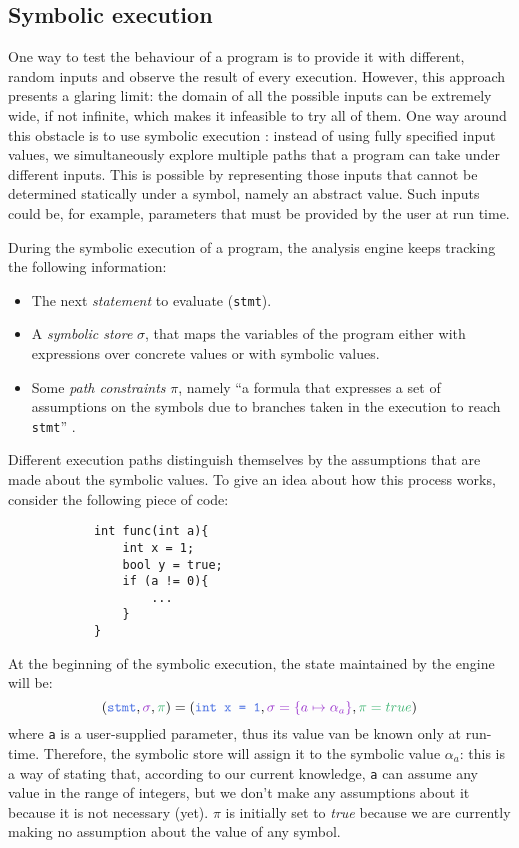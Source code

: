 \documentclass[target=mst,aauheader=aics]{thud}
\theoremstyle{definition}
\begin{document}
	\subsection{Symbolic execution}\label{sec:symbolic-exec}
	One way to test the behaviour of a program is to provide it with different, random inputs and observe the result of every execution. However, this approach presents a glaring limit: the domain of all the possible inputs can be extremely wide, if not infinite, which makes it infeasible to try all of them. One way around this obstacle is to use symbolic execution \cite{Baldoni2018} \cite{King76}: instead of using fully specified input values, we simultaneously explore multiple paths that a program can take under different inputs. This is possible by representing those inputs that cannot be determined statically under a symbol, namely an abstract value. Such inputs could be, for example, parameters that must be provided by the user at run time.
	
	During the symbolic execution of a program, the analysis engine keeps tracking the following information:
	\begin{itemize}
		\item The next \textit{statement} to evaluate (\texttt{stmt}).
		\item A \textit{symbolic store} $\sigma$, that maps the variables of the program either with expressions over concrete values or with symbolic values.
		\item Some \textit{path constraints} $\pi$, namely ``a formula that expresses a set of assumptions on the symbols due to branches taken in the execution to reach \texttt{stmt}'' \cite{Baldoni2018}.
	\end{itemize}
	Different execution paths distinguish themselves by the assumptions that are made about the symbolic values. To give an idea about how this process works, consider the following piece of code:
	
	\vspace{3mm}
	\begin{minipage}{.4\textwidth}
		\begin{lstlisting}
			int func(int a){
				int x = 1;
				bool y = true;
				if (a != 0){
					...
				}
			}
		\end{lstlisting} 
	\end{minipage}
	
	At the beginning of the symbolic execution, the state maintained by the engine will be:
	\[
	(\textcolor{blue}{\texttt{stmt}}, \textcolor{violet}{\sigma}, \textcolor{green}{\pi}) = (\textcolor{blue}{\texttt{int x = 1}}, \textcolor{violet}{\sigma = \{a \mapsto \alpha_a\}}, \textcolor{green}{\pi = true})
	\]
	where \texttt{a} is a user-supplied parameter, thus its value van be known only at run-time. Therefore, the symbolic store will assign it to the symbolic value $\alpha_a$: this is a way of stating that, according to our current knowledge, \texttt{a} can assume any value in the range of integers, but we don't make any assumptions about it because it is not necessary (yet). $\pi$ is initially set to \textit{true} because we are currently making no assumption about the value of any symbol.
	
\end{document}
